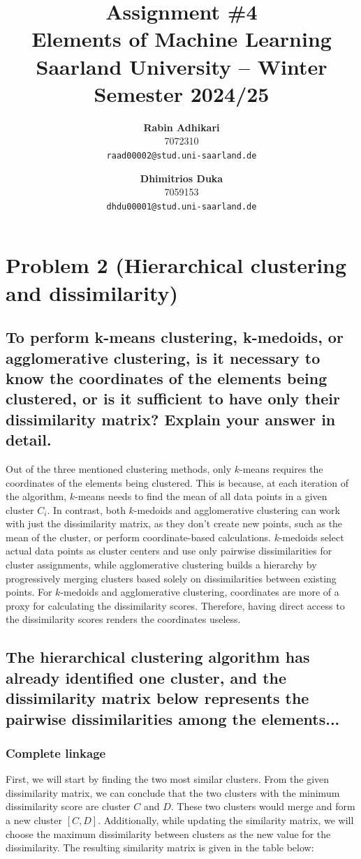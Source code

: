 \documentclass{article}
\title{Assignment \#4\\
  \vspace{2mm}
  \small{Elements of Machine Learning}
  \\
  \vspace{2mm}
  \small{Saarland University -- Winter Semester 2024/25}
}
\author{%
\textbf{Rabin Adhikari} \\
  7072310 \\
  \texttt{raad00002@stud.uni-saarland.de} \\
  \and
  \textbf{Dhimitrios Duka} \\
 7059153 \\
  \texttt{dhdu00001@stud.uni-saarland.de} \\
}
\begin{document}
\maketitle

\setcounter{section}{1}
\section{Problem 2 (Hierarchical clustering and dissimilarity)}
\subsection{To perform k-means clustering, k-medoids, or agglomerative clustering, is it necessary to know the coordinates of the elements being clustered, or is it sufficient to have only their dissimilarity matrix? Explain your answer in detail.}
Out of the three mentioned clustering methods, only $k$-means requires the coordinates of the elements being clustered. This is because, at each iteration of the algorithm, $k$-means needs to find the mean of all data points in a given cluster $C_i$. In contrast, both $k$-medoids and agglomerative clustering can work with just the dissimilarity matrix, as they don't create new points, such as the mean of the cluster, or perform coordinate-based calculations. $k$-medoids select actual data points as cluster centers and use only pairwise dissimilarities for cluster assignments, while agglomerative clustering builds a hierarchy by progressively merging clusters based solely on dissimilarities between existing points. For $k$-medoids and agglomerative clustering, coordinates are more of a proxy for calculating the dissimilarity scores. Therefore, having direct access to the dissimilarity scores renders the coordinates useless.

\subsection{The hierarchical clustering algorithm has already identified one cluster, and the dissimilarity matrix below represents the pairwise dissimilarities among the elements...}
\subsubsection{Complete linkage}
First, we will start by finding the two most similar clusters. From the given dissimilarity matrix, we can conclude that the two clusters with the minimum dissimilarity score are cluster $C$ and $D$. These two clusters would merge and form a new cluster $[C, D]$. Additionally, while updating the similarity matrix, we will choose the maximum dissimilarity between clusters as the new value for the dissimilarity. The resulting similarity matrix is given in the table below:
\end{document}
